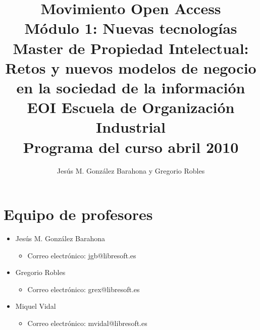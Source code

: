 \documentclass[a4paper,12pt]{article}
\title{Movimiento Open Access \\
Módulo 1: Nuevas tecnologías \\
Master de Propiedad Intelectual: \\
Retos y nuevos modelos de negocio en la sociedad de la información \\
EOI Escuela de Organización Industrial \\
Programa del curso abril 2010}
\author{Jesús M. González Barahona y Gregorio Robles}
\begin{document}
\maketitle

\newpage

\tableofcontents

\newpage

\section{Equipo de profesores}

\begin{itemize}
\item Jesús M. González Barahona
  \begin{itemize}
  \item Correo electrónico: jgb@libresoft.es
  \end{itemize}
\item Gregorio Robles
  \begin{itemize}
  \item Correo electrónico: grex@libresoft.es
  \end{itemize}
\item Miquel Vidal
  \begin{itemize}
  \item Correo electrónico: mvidal@libresoft.es
  \end{itemize}
\end{itemize}





\end{document}
